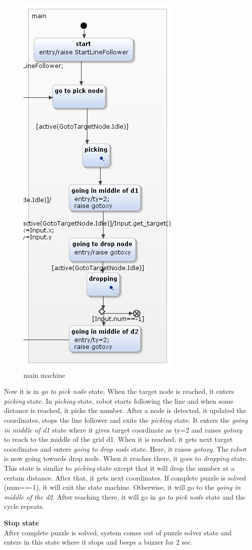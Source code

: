 \documentclass[a4paper,12pt,oneside]{book}
\begin{document}
\begin{itemize}
\begin{figure}[h]
	\includegraphics[scale=.6]{main.png}
	\caption{main machine}
\end{figure} Now it is in \textit{go to pick node} state. When the target node is reached, it enters \textit{picking} state. In \textit{picking} state, robot starts following the line and when some distance is reached, it picks the number. After a node is detected, it updated the coordinates, stops the line follower and exits the \textit{picking} state. It enters the \textit{going in middle of d1} state where it gives target coordinate as ty=2 and raises \textit{gotoxy} to reach to the middle of the grid d1. When it is reached, it gets next target coordinates and enters \textit{going to drop node} state. Here, it raises \textit{gotoxy}. The robot is now going towards drop node. When it reaches there, it goes to \textit{dropping} state. This state is similar to \textit{picking} state except that it will drop the number at a certain distance. 
After that, it gets next coordinates. If complete puzzle is solved (num==-1), it will exit the state machine. Otherwise, it will go to the \textit{going in middle of the d2}. After reaching there, it will go in \textit{go to pick node} state and the cycle repeats.

\end{itemize}
\textbf{Stop state}\\
After complete puzzle is solved, system comes out of puzzle solver state and enters in this state where it stops and beeps a buzzer for 2 sec.
\\
\end{document}
